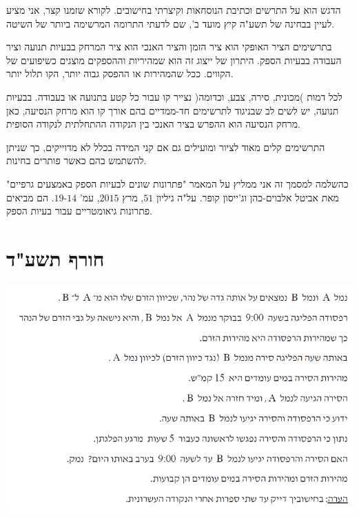 \documentclass[12pt,a4paper]{article}
\begin{document}
הדגש הוא על התרשים וכתיבת הנוסחאות וקיצרתי בחישובים. לקורא שזמנו קצר, אני מציע לעיין בבחינה של תשע"ה קיץ מועד ב', שם לדעתי התרומה המרשימה ביותר של השיטה.

\smallskip

בתרשימים הציר האופקי הוא ציר הזמן והציר האנכי הוא ציר המרחק בבעיות תנועה וציר העבודה בבעיות הספק. היתרון של ייצוג זה הוא שמהיריות וההספקים מוצגים כשיפועים של הקווים. ככל שהמהירות או ההפסק גבוה יותר, הקו תלול יותר.

\smallskip

לכל דמות )מכונית, סירה, צבע, וכדומה( נצייר קו עבור כל קטע בתנועה או בעבודה. בבעיות תנועה, יש לשים לב שבניגוד לתרשימים חד-ממדיים בהם אורך קו הוא מרחק הנסיעה, כאן מרחק הנסיעה הוא ההפרש בציר האנכי בין הנקודה ההתחלתית לנקודה הסופית.

\smallskip

התרשימים קלים מאוד לציור ומועילים גם אם קני המידה בכלל לא מדוייקים, כך שניתן להשתמש בהם כאשר פותרים בחינות.

\bigskip


כהשלמה למסמך זה אני ממליץ על המאמר "פתרונות שונים לבעיות הספק באמצעים גרפיים" מאת אביטל אלבוים-כהן וג'ייסון קופר. על"ה גיליון
$51$,
מרץ
$2015$,
עמ'
$14$-$19$.
הם מביאים פתרונות גיאומטריים עבור בעיות הספק.

\newpage


\section*{חורף תשע"ד}

\begin{center}
\includegraphics[width=.8\textwidth]{winter-2014-1}
\end{center}
\end{document}
